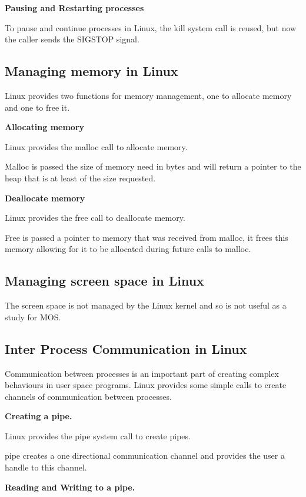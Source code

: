 \documentclass[a4paper]{report}
\begin{document}
\noindent
\textbf{Pausing and Restarting processes}

To pause and continue processes in Linux, the kill system call is reused, but now the caller sends the SIGSTOP signal.

\subsection{Managing memory in Linux}

Linux provides two functions for memory management, one to allocate memory and one to free it.

\noindent
\textbf{Allocating memory}

Linux provides the malloc call to allocate memory. \cite{manMalloc}

Malloc is passed the size of memory need in bytes and will return a pointer to the heap that is at least of the size requested.

\noindent
\textbf{Deallocate memory}

Linux provides the free call to deallocate memory.

Free is passed a pointer to memory that was received from malloc, it frees this memory allowing for it to be allocated during future calls to malloc.



\subsection{Managing screen space in Linux}

The screen space is not managed by the Linux kernel and so is not useful as a study for MOS.

\subsection{Inter Process Communication in Linux}

Communication between processes is an important part of creating complex behaviours in user space programs. Linux provides some simple calls to create channels of communication between processes.

\noindent
\textbf{Creating a pipe.}

Linux provides the pipe system call to create pipes. \cite{manPipe}

pipe creates a one directional communication channel and provides the user a handle to this channel.

\noindent
\textbf{Reading and Writing to a pipe.}
\end{document}
